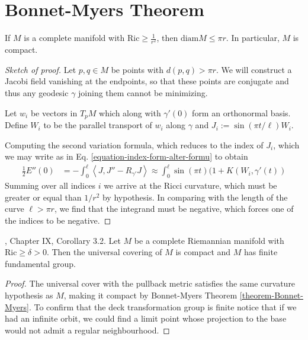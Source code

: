 \section{Bonnet-Myers Theorem}
\label{section-Bonnet-Myers-theorem}

\begin{theorem}
\label{theorem-Bonnet-Myers}
If $M$ is a complete manifold with
$\text{Ric} \geq \frac{1}{r^2}$, then
$\text{diam}M\leq \pi r$. In particular, $M$
is compact.
\end{theorem}

\begin{proof}[Sketch of proof]
Let $p,q \in M$ be points with $d(p,q)>\pi
r$. We will construct a Jacobi
field vanishing at the endpoints, so that
these points are conjugate and thus
any geodesic $\gamma$ joining them cannot be
minimizing.

Let $w_i$ be vectors in $T_pM$ which along
with $\gamma'(0)$ form an orthonormal
basis. Define $W_i$ to be the parallel
transport of $w_i$ along $\gamma$ and
$J_i:=\sin(\pi t/\ell)W_i$.

Computing the second variation formula, which
reduces to the index of $J_i$,
which we may write as in Eq.
\ref{equation-index-form-alter-formu} to
obtain
$$
\begin{aligned}
\frac{1}{2}E''(0)&=-\int_0^\ell\left\langle{}J,J''-
R_{\gamma'}J\right\rangle{}
\approx\int_0^\ell \sin(\pi
t)(1+K(W_i,\gamma'(t))
\end{aligned}
$$
Summing over all indices $i$ we arrive at the
Ricci curvature, which must be
greater or equal than $1/r^2$ by hypothesis.
In comparing with the length of the
curve $\ell>\pi r$, we find that the
integrand must be
negative, which forces one of the indices to
be negative.
\end{proof}

\begin{lemma}
\label{lemma-bonne-myers-impli-compa-unive}
\cite{doc}, Chapter IX, Corollary 3.2. Let
$M$ be a complete Riemannian manifold
with $\text{Ric}\geq \delta>0$. Then the
universal covering of $M$ is compact
and $M$ has finite fundamental group.
\end{lemma}

\begin{proof}

The universal cover with the pullback metric
satisfies the same curvature
hypothesis as $M$, making it compact by
Bonnet-Myers Theorem
\ref{theorem-Bonnet-Myers}. To confirm that
the deck transformation group is
finite notice that if we had an infinite
orbit, we could find a limit point
whose projection to the base would not admit
a regular neighbourhood.
\end{proof}


